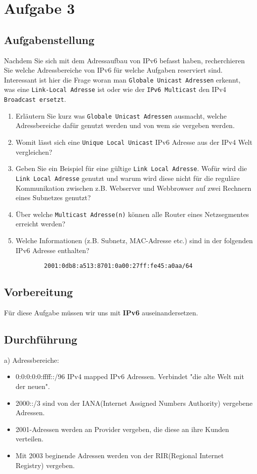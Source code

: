 \newpage

\section{Aufgabe 3}

\subsection{Aufgabenstellung}
Nachdem Sie sich mit dem Adressaufbau von IPv6 befasst haben, recherchieren Sie welche Adressbereiche von IPv6 für welche Aufgaben reserviert sind. Interessant ist hier die Frage woran man \texttt{Globale Unicast Adressen} erkennt, was eine \texttt{Link-Local Adresse} ist oder wie der \texttt{IPv6 Multicast} den IPv4 \texttt{Broadcast ersetzt}.

\begin{enumerate}[label=(\alph*)]
	\item Erläutern Sie kurz was \texttt{Globale Unicast Adressen} ausmacht, welche Adressbereiche dafür genutzt werden und von wem sie vergeben werden.
	\item Womit lässt sich eine \texttt{Unique Local Unicast} IPv6 Adresse aus der IPv4 Welt vergleichen?
	\item Geben Sie ein Beispiel für eine gültige  \texttt{Link Local Adresse}. Wofür wird die  \texttt{Link Local Adresse} genutzt und warum wird diese nicht für die reguläre Kommunikation zwischen z.B. Webserver und Webbrowser auf zwei Rechnern eines Subnetzes genutzt?
	\item Über welche \texttt{Multicast Adresse(n)} können alle Router eines Netzsegmentes erreicht werden?
	\item Welche Informationen (z.B. Subnetz, MAC-Adresse etc.) sind in der folgenden IPv6 Adresse enthalten?
\begin{lstlisting}
		2001:0db8:a513:8701:0a00:27ff:fe45:a0aa/64
\end{lstlisting}
\end{enumerate}

\subsection{Vorbereitung}
Für diese Aufgabe müssen wir uns mit \textbf{IPv6} auseinandersetzen.

\subsection{Durchführung}
a) Adressbereiche:
\begin{itemize}
\item 0:0:0:0:0:ffff::/96 IPv4 mapped IPv6 Adressen. Verbindet "die alte Welt mit der neuen".
\item 2000::/3 sind von der IANA(Internet Assigned Numbers Authority) vergebene Adressen.
\item 2001-Adressen werden an Provider vergeben, die diese an ihre Kunden verteilen.
\item Mit 2003 beginende Adressen werden von der RIR(Regional Internet Registry) vergeben.
\end{itemize}

